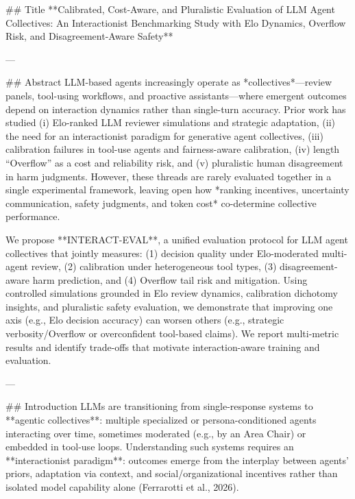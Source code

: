 ## Title  
**Calibrated, Cost-Aware, and Pluralistic Evaluation of LLM Agent Collectives: An Interactionist Benchmarking Study with Elo Dynamics, Overflow Risk, and Disagreement-Aware Safety**

---

## Abstract  
LLM-based agents increasingly operate as *collectives*—review panels, tool-using workflows, and proactive assistants—where emergent outcomes depend on interaction dynamics rather than single-turn accuracy. Prior work has studied (i) Elo-ranked LLM reviewer simulations and strategic adaptation, (ii) the need for an interactionist paradigm for generative agent collectives, (iii) calibration failures in tool-use agents and fairness-aware calibration, (iv) length “Overflow” as a cost and reliability risk, and (v) pluralistic human disagreement in harm judgments. However, these threads are rarely evaluated together in a single experimental framework, leaving open how *ranking incentives, uncertainty communication, safety judgments, and token cost* co-determine collective performance.

We propose **INTERACT-EVAL**, a unified evaluation protocol for LLM agent collectives that jointly measures: (1) decision quality under Elo-moderated multi-agent review, (2) calibration under heterogeneous tool types, (3) disagreement-aware harm prediction, and (4) Overflow tail risk and mitigation. Using controlled simulations grounded in Elo review dynamics, calibration dichotomy insights, and pluralistic safety evaluation, we demonstrate that improving one axis (e.g., Elo decision accuracy) can worsen others (e.g., strategic verbosity/Overflow or overconfident tool-based claims). We report multi-metric results and identify trade-offs that motivate interaction-aware training and evaluation.

---

## Introduction  
LLMs are transitioning from single-response systems to **agentic collectives**: multiple specialized or persona-conditioned agents interacting over time, sometimes moderated (e.g., by an Area Chair) or embedded in tool-use loops. Understanding such systems requires an **interactionist paradigm**: outcomes emerge from the interplay between agents’ priors, adaptation via context, and social/organizational incentives rather than isolated model capability alone (Ferrarotti et al., 2026).

